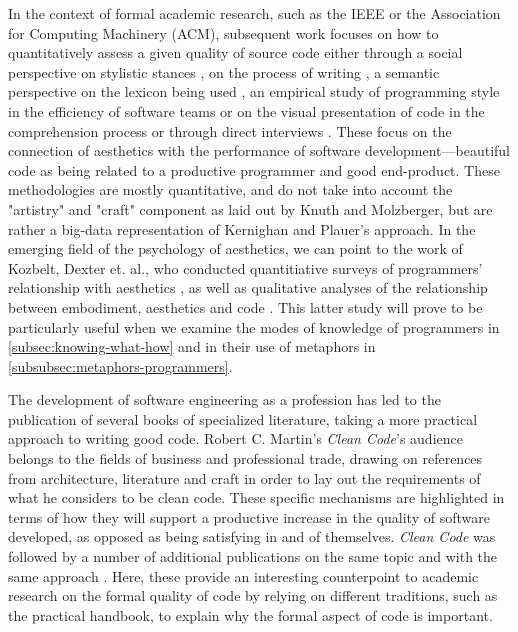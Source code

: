 In the context of formal academic research, such as the IEEE or the Association for Computing Machinery (ACM), subsequent work focuses on how to quantitatively assess a given quality of source code either through a social perspective on stylistic stances \citep{oman_taxonomy_1990}, on the process of writing \citep{norick_effects_2010}, a semantic perspective on the lexicon being used \citep{fakhoury_improving_2019,guerrouj_normalizing_2013}, an empirical study of programming style in the efficiency of software teams \citep{reed_sometimes_2010,coleman_aesthetics_2018} or on the visual presentation of code in the comprehension process \citep{marcus_graphic_1982} or through direct interviews \citep{hermans_role_2020}.  These focus on the connection of aesthetics with the performance of software development—beautiful code as being related to a productive programmer and good end-product. These methodologies are mostly quantitative, and do not take into account the "artistry" and "craft" component as laid out by Knuth and Molzberger, but are rather a big-data representation of Kernighan and Plauer's approach. In the emerging field of the psychology of aesthetics, we can point to the work of Kozbelt, Dexter et. al., who conducted quantitiative surveys of programmers' relationship with aesthetics \citep{kozbelt_aesthetics_2012}, as well as qualitative analyses of the relationship between embodiment, aesthetics and code \citep{dexter_embodied_2011}. This latter study will prove to be particularly useful when we examine the modes of knowledge of programmers in \ref{subsec:knowing-what-how} and in their use of metaphors in \ref{subsubsec:metaphors-programmers}.

The development of software engineering as a profession has led to the publication of several books of specialized literature, taking a more practical approach to writing good code. Robert C. Martin's \emph{Clean Code}'s audience belongs to the fields of business and professional trade, drawing on references from architecture, literature and craft in order to lay out the requirements of what he considers to be clean code. These specific mechanisms are highlighted in terms of how they will support a productive increase in the quality of software developed, as opposed as being satisfying in and of themselves. \emph{Clean Code} was followed by a number of additional publications on the same topic and with the same approach \citep{fowler_refactoring_1999,arns_code_2005,hunt_pragmatic_1999}. Here, these provide an interesting counterpoint to academic research on the formal quality of code by relying on different traditions, such as the practical handbook, to explain why the formal aspect of code is important.

